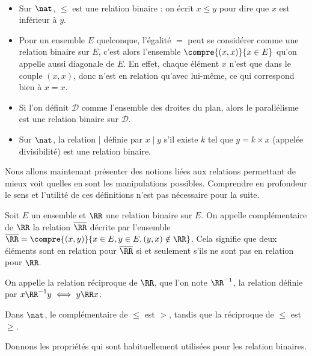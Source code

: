 \begin{expl}

\ 
    \begin{itemize}[label=$\bullet$]
        \item Sur $\nat$, $\leq$ est une relation binaire : on écrit $x\leq y$ pour dire que $x$ est inférieur à $y$.
        \item Pour un ensemble $E$ quelconque, l'égalité $=$ peut se considérer comme une relation binaire sur $E$, c'est alors l'ensemble $\compre{(x,x)}{x\in E}$ qu'on appelle aussi diagonale de $E$. En effet, chaque élément $x$ n'est que dans le couple $(x,x)$, donc n'est en relation qu'avec lui-même, ce qui correspond bien à $x=x$.
        \item Si l'on définit $\mathcal D$ comme l'ensemble des droites du plan, alors le parallélisme est une relation binaire sur $\mathcal D$.
        \item Sur $\nat$, la relation $|$ définie par $x\mid y$ s'il existe $k$ tel que $y=k\times x$ (appelée divisibilité) est une relation binaire.
    \end{itemize}
\end{expl}

Nous allons maintenant présenter des notions liées aux relations permettant de mieux voit quelles en sont les manipulations possibles. Comprendre en profondeur le sens et l'utilité de ces définitions n'est pas nécessaire pour la suite.

\begin{defi}
    Soit $E$ un ensemble et $\RR$ une relation binaire sur $E$. On appelle complémentaire de $\RR$ la relation $\overline\RR$ décrite par l'ensemble $\overline\RR = \compre{(x,y)}{x\in E, y \in E, (y,x)\notin \RR}$. Cela signifie que deux éléments sont en relation pour $\overline\RR$ si et seulement s'ils ne sont pas en relation pour $\RR$.
    
    On appelle la relation réciproque de $\RR$, que l'on note $\RR ^{-1}$, la relation définie par $x\RR ^{-1} y \iff y\RR x$.
\end{defi}

\begin{expl}
    Dans $\nat$, le complémentaire de $\leq$ est $>$, tandis que la réciproque de $\leq$ est $\geq$.
\end{expl}

Donnons les propriétés qui sont habituellement utilisées pour les relation binaires.

